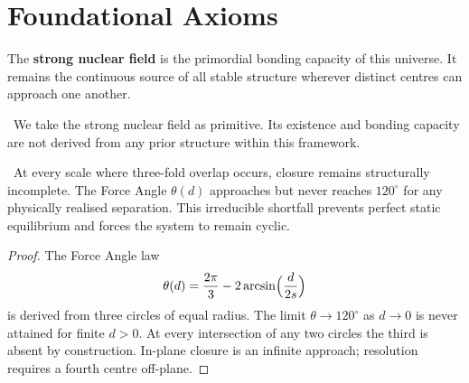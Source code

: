 \section{Foundational Axioms}
\label{sec:axioms}

\begin{definition}
The \textbf{strong nuclear field} is the primordial bonding capacity of this
universe. It remains the continuous source of all stable structure wherever
distinct centres can approach one another.
\end{definition}

\begin{assumption}
\assumed\ We take the strong nuclear field as primitive. Its existence and
bonding capacity are not derived from any prior structure within this framework.
\end{assumption}

\begin{theorem}
\derived\ At every scale where three-fold overlap occurs, closure remains
structurally incomplete. The Force Angle $\theta(d)$ approaches but never reaches
$120^\circ$ for any physically realised separation. This irreducible shortfall
prevents perfect static equilibrium and forces the system to remain cyclic.
\end{theorem}

\begin{proof}
The Force Angle law
\[
\theta(d)=\frac{2\pi}{3}-2\arcsin\Bigl(\frac{d}{2s}\Bigr)
\]
is derived from three circles of equal radius. The limit $\theta\to 120^\circ$ as
$d\to 0$ is never attained for finite $d>0$. At every intersection of any two
circles the third is absent by construction. In-plane closure is an infinite
approach; resolution requires a fourth centre off-plane.
\end{proof}
